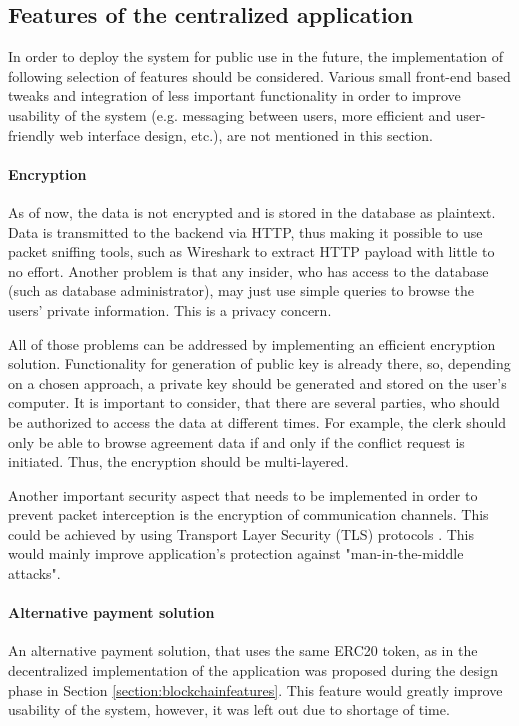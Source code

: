 \subsection{Features of the centralized application} \label{section:futureworkapp}

In order to deploy the system for public use in the future, the implementation of following selection of features should be considered. Various small front-end based tweaks and integration of less important functionality in order to improve usability of the system (e.g. messaging between users, more efficient and user-friendly web interface design, etc.), are not mentioned in this section.

\paragraph{Encryption}
As of now, the data is not encrypted and is stored in the database as plaintext. Data is transmitted to the backend via HTTP, thus making it possible to use packet sniffing tools, such as Wireshark to extract HTTP payload with little to no effort. Another problem is that any insider, who has access to the database (such as database administrator), may just use simple queries to browse the users' private information. This is a privacy concern.

All of those problems can be addressed by implementing an efficient encryption solution. Functionality for generation of public key is already there, so, depending on a chosen approach, a private key should be generated and stored on the user's computer. It is important to consider, that there are several parties, who should be authorized to access the data at different times. For example, the clerk should only be able to browse agreement data if and only if the conflict request is initiated. Thus, the encryption should be multi-layered.

Another important security aspect that needs to be implemented in order to prevent packet interception is the encryption of communication channels. This could be achieved by using Transport Layer Security (TLS) protocols \citep{ssl}. This would mainly improve application's protection against "man-in-the-middle attacks".

\paragraph{Alternative payment solution}

An alternative payment solution, that uses the same ERC20 token, as in the decentralized implementation of the application was proposed during the design phase in Section \ref{section:blockchainfeatures}. This feature would greatly improve usability of the system, however, it was left out due to shortage of time.

